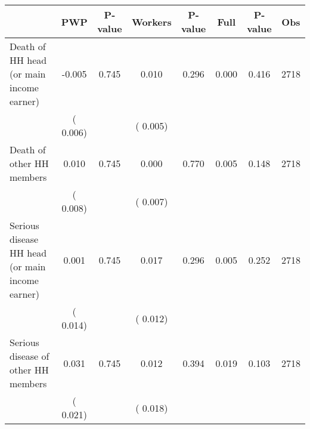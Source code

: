 
\begin{tabular}{l*{7}{c}}\hline&\multicolumn{1}{c}{PWP}&\multicolumn{1}{c}{P-value}&\multicolumn{1}{c}{Workers}&\multicolumn{1}{c}{P-value}&\multicolumn{1}{c}{Full}&\multicolumn{1}{c}{P-value}&\multicolumn{1}{c}{Obs} \\ \hline

 Death of HH head (or main income earner)       &             -0.005       &        0.745  &              0.010       &        0.296  &              0.000       &              0.416 &  2718 \\ 
                       &       (       0.006)             &                               &       (       0.005)                     &                               &                                               &                                &                      \\ 

 Death of other HH members       &              0.010       &        0.745  &              0.000       &        0.770  &              0.005       &              0.148 &  2718 \\ 
                       &       (       0.008)             &                               &       (       0.007)                     &                               &                                               &                                &                      \\ 

 Serious disease HH head (or main income earner)       &              0.001       &        0.745  &              0.017       &        0.296  &              0.005       &              0.252 &  2718 \\ 
                       &       (       0.014)             &                               &       (       0.012)                     &                               &                                               &                                &                      \\ 

 Serious disease of other HH members       &              0.031       &        0.745  &              0.012       &        0.394  &              0.019       &              0.103 &  2718 \\ 
                       &       (       0.021)             &                               &       (       0.018)                     &                               &                                               &                                &                      \\ 


\end{tabular}
